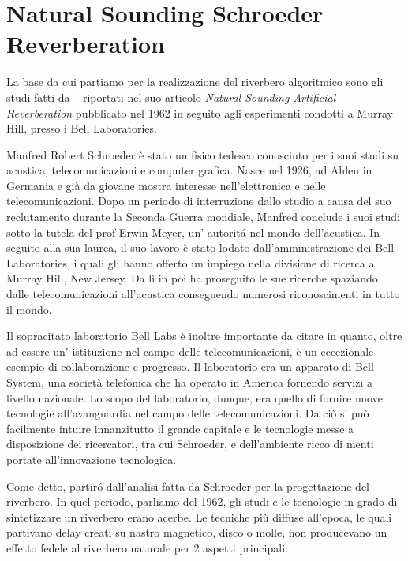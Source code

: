 \section{Natural Sounding Schroeder Reverberation}
\label{sec:shroeder1}

La base da cui partiamo per la realizzazione del riverbero algoritmico sono gli
studi fatti da \ms~ riportati nel suo articolo
\emph{Natural Sounding Artificial Reverberation} pubblicato nel 1962 in seguito
agli esperimenti condotti a Murray Hill, presso i Bell Laboratories.

Manfred Robert Schroeder è stato un fisico tedesco conosciuto per i suoi studi
su acustica, telecomunicazioni e computer grafica. Nasce nel 1926, ad Ahlen in
Germania e già da giovane mostra interesse nell’elettronica e nelle
telecomunicazioni. Dopo un periodo di interruzione dallo studio a causa del suo
reclutamento durante la Seconda Guerra mondiale, Manfred conclude i suoi studi
sotto la tutela del prof Erwin Meyer, un’ autoritá nel mondo dell’acustica.
In seguito alla sua laurea, il suo lavoro è stato lodato dall’amministrazione
dei Bell Laboratories, i quali gli hanno offerto un impiego nella divisione di
ricerca a Murray Hill, New Jersey. Da lì in poi ha proseguito le sue ricerche
spaziando dalle telecomunicazioni all’acustica conseguendo numerosi
riconoscimenti in tutto il mondo.

Il sopracitato laboratorio Bell Labs è inoltre importante da citare in quanto,
oltre ad essere un’ istituzione nel campo delle telecomunicazioni, è un
eccezionale esempio di collaborazione e progresso. Il laboratorio era un
apparato di Bell System, una società telefonica che ha operato in America
fornendo servizi a livello nazionale. Lo scopo del laboratorio, dunque, era
quello di fornire nuove tecnologie all’avanguardia nel campo delle
telecomunicazioni. Da ciò si può facilmente intuire innanzitutto il grande
capitale e le tecnologie messe a disposizione dei ricercatori, tra cui
Schroeder, e dell’ambiente ricco di menti portate all’innovazione tecnologica.


Come detto, partiró dall’analisi fatta da Schroeder per la progettazione del
riverbero. In quel periodo, parliamo del 1962, gli studi e le tecnologie in
grado di sintetizzare un riverbero erano acerbe. Le tecniche più diffuse
all’epoca, le quali partivano delay creati su nastro magnetico, disco o molle,
non producevano un effetto fedele al riverbero naturale per 2 aspetti principali:

